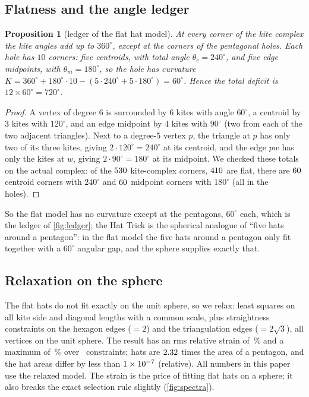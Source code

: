 \documentclass[11pt]{article}
\newtheorem{proposition}[theorem]{Proposition}
\theoremstyle{definition}
\theoremstyle{remark}
\begin{document}
\subsection{Flatness and the angle ledger}
\begin{proposition}[ledger of the flat hat model]\label{prop:hatledger}
At every corner of the kite complex the kite angles add up to $360^\circ$, except at the corners of the pentagonal holes. Each hole has $10$ corners: five centroids, with total angle $\theta_c=240^\circ$, and five edge midpoints,
with $\theta_m=180^\circ$, so the hole has curvature $K=360^\circ+180^\circ\cdot10-(5\cdot240^\circ+5\cdot180^\circ)=60^\circ$. Hence the total deficit is $12\times60^\circ=720^\circ$.
\end{proposition}
\begin{proof}
A vertex of degree $6$ is surrounded by $6$ kites with angle $60^\circ$, a centroid by $3$ kites with $120^\circ$, and an edge midpoint by $4$ kites with $90^\circ$ (two from each of the two adjacent triangles). Next to a degree-$5$ vertex $p$, the triangle at $p$ has only two of its three kites, giving $2\cdot120^\circ=240^\circ$ at its centroid, and the edge $pw$ has only the kites at $w$, giving $2\cdot90^\circ=180^\circ$ at its midpoint. We checked these totals on the actual complex:
of the $530$ kite-complex corners, $410$ are flat, there are $60$ centroid corners with $240^\circ$ and $60$ midpoint corners with $180^\circ$ (all in the holes).
\end{proof}
So the flat model has no curvature except at the pentagons, $60^\circ$ each, which is the ledger of \cref{fig:ledger}; the Hat Trick is the spherical analogue of ``five hats around a pentagon'': in the flat model the five hats around a pentagon only fit together with a $60^\circ$ angular gap, and the sphere supplies exactly that.

\subsection{Relaxation on the sphere}
The flat hats do not fit exactly on the unit sphere, so we relax: least squares on all kite side and diagonal lengths with a common scale, plus straightness constraints on the hexagon edges ($=2$) and the triangulation edges ($=2\sqrt3$), all vertices on the unit sphere.
The result has an rms relative strain of \htRms\,\% and a maximum of \htMaxStrain\,\% over \htNConstraints\ constraints; hats are $2.32$ times the area of a pentagon, and the hat areas differ by less than $1\times10^{-7}$ (relative). All numbers in this paper use the relaxed model.
The strain is the price of fitting flat hats on a sphere; it also breaks the exact selection rule slightly (\cref{fig:spectra}).
\end{document}
